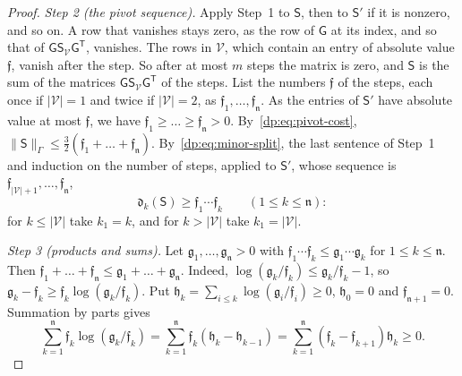 \documentclass[11pt]{amsart}
\theoremstyle{definition}
\theoremstyle{remark}
\numberwithin{equation}{section}
\newcommand{\abs}[1]{\lvert #1\rvert}
\newcommand{\norm}[1]{\lVert #1\rVert}
\theoremstyle{plain}
\theoremstyle{definition}
\theoremstyle{plain}
\begin{document}
\begin{proof}
\emph{Step 2 (the pivot sequence).} Apply Step~1 to $\mathsf S$, then to $\mathsf S'$ if it is nonzero, and so on. A row that vanishes stays zero, as the row of $\mathsf G$ at its index, and so that of $\mathsf G\mathsf S_{\mathcal V}\mathsf G^{\mathsf T}$, vanishes. The rows in $\mathcal V$, which contain an entry of absolute value $\mathfrak f$, vanish after the step. So after at most $m$ steps the matrix is zero, and $\mathsf S$ is the sum of the matrices $\mathsf G\mathsf S_{\mathcal V}\mathsf G^{\mathsf T}$ of the steps. List the numbers $\mathfrak f$ of the steps, each once if $\abs{\mathcal V}=1$ and twice if $\abs{\mathcal V}=2$, as $\mathfrak f_1,\dots,\mathfrak f_{\mathfrak n}$. As the entries of $\mathsf S'$ have absolute value at most $\mathfrak f$, we have $\mathfrak f_1\ge\dots\ge\mathfrak f_{\mathfrak n}>0$. By~\eqref{dp:eq:pivot-cost}, $\norm{\mathsf S}_\Gamma\le\frac32(\mathfrak f_1+\dots+\mathfrak f_{\mathfrak n})$. By~\eqref{dp:eq:minor-split}, the last sentence of Step~1 and induction on the number of steps, applied to $\mathsf S'$, whose sequence is $\mathfrak f_{\abs{\mathcal V}+1},\dots,\mathfrak f_{\mathfrak n}$,
\begin{equation}\label{dp:eq:minor-lower}
 \mathfrak d_k(\mathsf S)\ge\mathfrak f_1\cdots\mathfrak f_k\qquad(1\le k\le\mathfrak n):
\end{equation}
for $k\le\abs{\mathcal V}$ take $k_1=k$, and for $k>\abs{\mathcal V}$ take $k_1=\abs{\mathcal V}$.

\emph{Step 3 (products and sums).} Let $\mathfrak g_1,\dots,\mathfrak g_{\mathfrak n}>0$ with $\mathfrak f_1\cdots\mathfrak f_k\le\mathfrak g_1\cdots\mathfrak g_k$ for $1\le k\le\mathfrak n$. Then $\mathfrak f_1+\dots+\mathfrak f_{\mathfrak n}\le\mathfrak g_1+\dots+\mathfrak g_{\mathfrak n}$. Indeed, $\log(\mathfrak g_k/\mathfrak f_k)\le\mathfrak g_k/\mathfrak f_k-1$, so $\mathfrak g_k-\mathfrak f_k\ge\mathfrak f_k\log(\mathfrak g_k/\mathfrak f_k)$. Put $\mathfrak h_k=\sum_{i\le k}\log(\mathfrak g_i/\mathfrak f_i)\ge0$, $\mathfrak h_0=0$ and $\mathfrak f_{\mathfrak n+1}=0$. Summation by parts gives
\[
 \sum_{k=1}^{\mathfrak n}\mathfrak f_k\log(\mathfrak g_k/\mathfrak f_k)=\sum_{k=1}^{\mathfrak n}\mathfrak f_k(\mathfrak h_k-\mathfrak h_{k-1})
 =\sum_{k=1}^{\mathfrak n}(\mathfrak f_k-\mathfrak f_{k+1})\mathfrak h_k\ge0.
\]


\end{proof}
\end{document}
